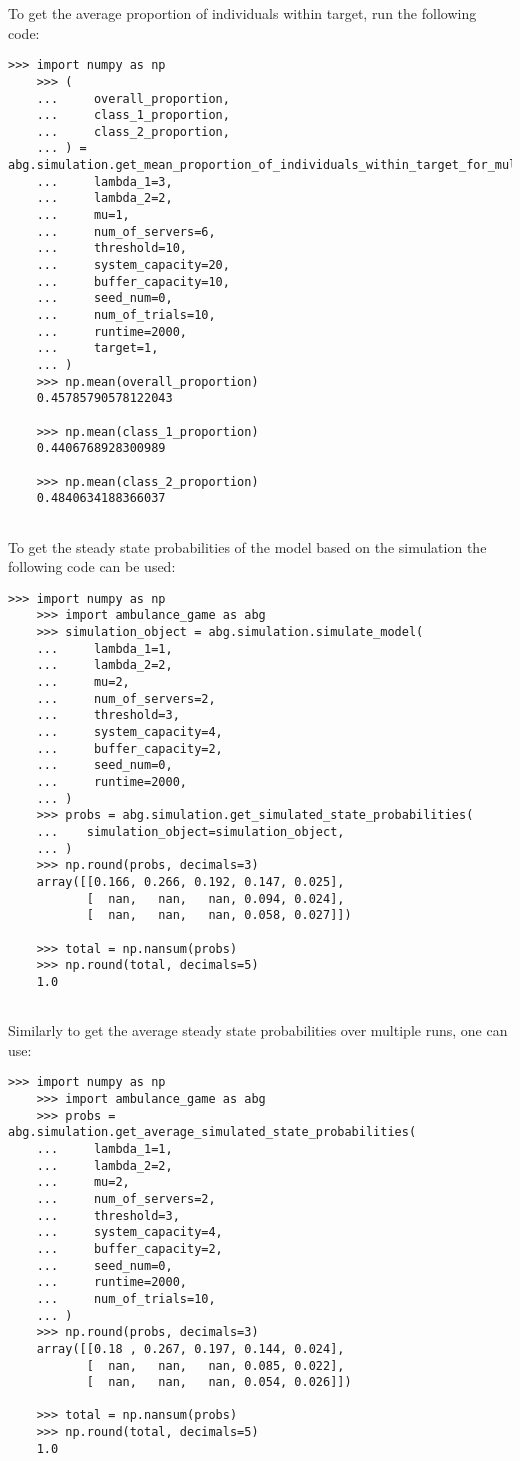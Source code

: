 To get the average proportion of individuals within target, run the following
code:

\begin{lstlisting}[style=pystyle]
    >>> import numpy as np
    >>> (
    ...     overall_proportion,
    ...     class_1_proportion,
    ...     class_2_proportion,
    ... ) = abg.simulation.get_mean_proportion_of_individuals_within_target_for_multiple_runs(    
    ...     lambda_1=3,
    ...     lambda_2=2,
    ...     mu=1,
    ...     num_of_servers=6,
    ...     threshold=10,
    ...     system_capacity=20,
    ...     buffer_capacity=10,
    ...     seed_num=0,
    ...     num_of_trials=10,
    ...     runtime=2000,
    ...     target=1,
    ... )
    >>> np.mean(overall_proportion)
    0.45785790578122043

    >>> np.mean(class_1_proportion)
    0.4406768928300989

    >>> np.mean(class_2_proportion)
    0.4840634188366037
    
\end{lstlisting}

To get the steady state probabilities of the model based on the simulation the
following code can be used:
\begin{lstlisting}[style=pystyle]
    >>> import numpy as np
    >>> import ambulance_game as abg
    >>> simulation_object = abg.simulation.simulate_model(
    ...     lambda_1=1,
    ...     lambda_2=2,
    ...     mu=2,
    ...     num_of_servers=2,
    ...     threshold=3,
    ...     system_capacity=4,
    ...     buffer_capacity=2,
    ...     seed_num=0,
    ...     runtime=2000,
    ... )
    >>> probs = abg.simulation.get_simulated_state_probabilities(
    ...    simulation_object=simulation_object,
    ... )
    >>> np.round(probs, decimals=3)
    array([[0.166, 0.266, 0.192, 0.147, 0.025],
           [  nan,   nan,   nan, 0.094, 0.024],
           [  nan,   nan,   nan, 0.058, 0.027]])

    >>> total = np.nansum(probs)
    >>> np.round(total, decimals=5)
    1.0
       

\end{lstlisting}

Similarly to get the average steady state probabilities over multiple runs,
one can use:

\begin{lstlisting}[style=pystyle]
    >>> import numpy as np
    >>> import ambulance_game as abg
    >>> probs = abg.simulation.get_average_simulated_state_probabilities(
    ...     lambda_1=1,
    ...     lambda_2=2,
    ...     mu=2,
    ...     num_of_servers=2,
    ...     threshold=3,
    ...     system_capacity=4,
    ...     buffer_capacity=2,
    ...     seed_num=0,
    ...     runtime=2000,
    ...     num_of_trials=10,
    ... )
    >>> np.round(probs, decimals=3)
    array([[0.18 , 0.267, 0.197, 0.144, 0.024],
           [  nan,   nan,   nan, 0.085, 0.022],
           [  nan,   nan,   nan, 0.054, 0.026]])
    
    >>> total = np.nansum(probs)
    >>> np.round(total, decimals=5)
    1.0

\end{lstlisting}

